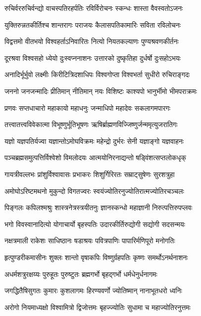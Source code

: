 \twolineshloka
{रुचिर्वररुचिर्वन्द्यो वाचस्पतिरहर्पतिः}
{रविर्विरोचनः स्कन्धः शास्ता वैवस्वतोऽजनः}

\twolineshloka
{युक्तिरुन्नतकीर्तिश्च शान्तरागः पराजयः}
{कैलासपतिकामारिः सविता रविलोचनः}

\twolineshloka
{विद्वत्तमो वीतभयो विश्वहर्ताऽनिवारितः}
{नित्यो नियतकल्याणः पुण्यश्रवणकीर्तनः}

\twolineshloka
{दूरश्रवा विश्वसहो ध्येयो दुःस्वप्ननाशनः}
{उत्तारको दुष्कृतिहा दुर्धर्षो दुःसहोऽभयः}

\twolineshloka
{अनादिर्भूर्भुवो लक्ष्मीः किरीटित्रिदशाधिपः}
{विश्वगोप्ता विश्वभर्ता सुधीरो रुचिराङ्गदः}

\twolineshloka
{जननो जनजन्मादिः प्रीतिमान् नीतिमान् नयः}
{विशिष्टः काश्यपो भानुर्भीमो भीमपराक्रमः}

\twolineshloka
{प्रणवः सप्तधाचारो महाकायो महाधनुः}
{जन्माधिपो महादेवः सकलागमपारगः}

\twolineshloka
{तत्त्वातत्त्वविवेकात्मा विभूष्णुर्भूतिभूषणः}
{ऋषिर्ब्राह्मणविज्जिष्णुर्जन्ममृत्युजरातिगः}

\twolineshloka
{यज्ञो यज्ञपतिर्यज्वा यज्ञान्तोऽमोघविक्रमः}
{महेन्द्रो दुर्भरः सेनी यज्ञाङ्गो यज्ञवाहनः}

\twolineshloka
{पञ्चब्रह्मसमुत्पत्तिर्विश्वेशो विमलोदयः}
{आत्मयोनिरनाद्यन्तो षड्विंशत्सप्तलोकधृक्}

\twolineshloka
{गायत्रीवल्लभः प्रांशुर्विश्वावासः प्रभाकरः}
{शिशुर्गिरिरतः सम्राट्सुषेणः सुरशत्रुहा}

\twolineshloka
{अमोघोऽरिष्टमथनो मुकुन्दो विगतज्वरः}
{स्वयंज्योतिरनुज्योतिरात्मज्योतिरचञ्चलः}

\twolineshloka
{पिङ्गलः कपिलश्मश्रुः शास्त्रनेत्रस्त्रयीतनुः}
{ज्ञानस्कन्धो महाज्ञानी निरुत्पत्तिरुपप्लवः}

\twolineshloka
{भगो विवस्वानादित्यो योगाचार्यो बृहस्पतिः}
{उदारकीर्तिरुद्योगी सद्योगी सदसन्मयः}

\twolineshloka
{नक्षत्रमाली राकेशः साधिष्ठानः षडाश्रयः}
{पवित्रपाणिः पापारिर्मणिपूरो मनोगतिः}

\twolineshloka
{हृत्पुण्डरीकमासीनः शुक्लः शान्तो वृषाकपिः}
{विष्णुर्ग्रहपतिः कृष्णः समर्थोऽनर्थनाशनः}

\twolineshloka
{अधर्मशत्रुरक्षय्यः पुरुहूतः पुरुष्टुतः}
{ब्रह्मगर्भो बृहद्गर्भो धर्मधेनुर्धनागमः}

\twolineshloka
{जगद्धितैषिसुगतः कुमारः कुशलागमः}
{हिरण्यवर्णो ज्योतिष्मान् नानाभूतधरो ध्वनिः}

\twolineshloka
{अरोगो नियमाध्यक्षो विश्वामित्रो द्विजोत्तमः}
{बृहज्ज्योतिः सुधामा च महाज्योतिरनुत्तमः}

